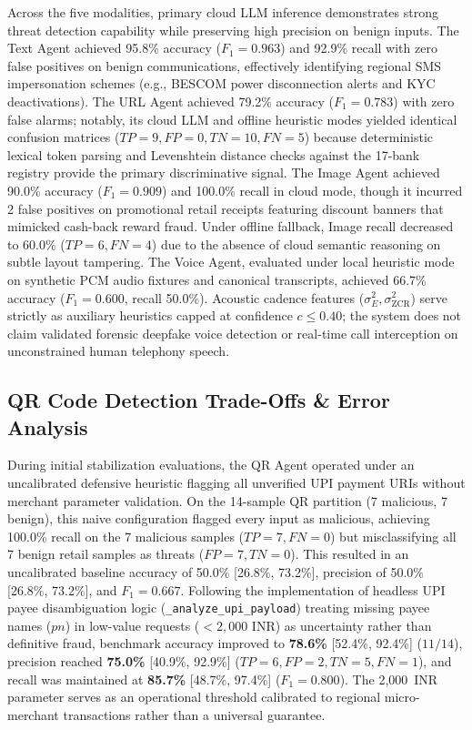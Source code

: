 \documentclass[conference]{IEEEtran}
\begin{document}
Across the five modalities, primary cloud LLM inference demonstrates strong threat detection capability while preserving high precision on benign inputs. The Text Agent achieved 95.8\% accuracy ($F_1 = 0.963$) and 92.9\% recall with zero false positives on benign communications, effectively identifying regional SMS impersonation schemes (e.g., BESCOM power disconnection alerts and KYC deactivations). The URL Agent achieved 79.2\% accuracy ($F_1 = 0.783$) with zero false alarms; notably, its cloud LLM and offline heuristic modes yielded identical confusion matrices ($TP=9, FP=0, TN=10, FN=5$) because deterministic lexical token parsing and Levenshtein distance checks against the 17-bank registry provide the primary discriminative signal. The Image Agent achieved 90.0\% accuracy ($F_1 = 0.909$) and 100.0\% recall in cloud mode, though it incurred 2 false positives on promotional retail receipts featuring discount banners that mimicked cash-back reward fraud. Under offline fallback, Image recall decreased to 60.0\% ($TP=6, FN=4$) due to the absence of cloud semantic reasoning on subtle layout tampering. The Voice Agent, evaluated under local heuristic mode on synthetic PCM audio fixtures and canonical transcripts, achieved 66.7\% accuracy ($F_1 = 0.600$, recall 50.0\%). Acoustic cadence features ($\sigma_E^2, \sigma_{\text{ZCR}}^2$) serve strictly as auxiliary heuristics capped at confidence $c \le 0.40$; the system does not claim validated forensic deepfake voice detection or real-time call interception on unconstrained human telephony speech.

\subsection{QR Code Detection Trade-Offs \& Error Analysis}
During initial stabilization evaluations, the QR Agent operated under an uncalibrated defensive heuristic flagging all unverified UPI payment URIs without merchant parameter validation. On the 14-sample QR partition (7 malicious, 7 benign), this naive configuration flagged every input as malicious, achieving 100.0\% recall on the 7 malicious samples ($TP=7, FN=0$) but misclassifying all 7 benign retail samples as threats ($FP=7, TN=0$). This resulted in an uncalibrated baseline accuracy of 50.0\% [26.8\%, 73.2\%], precision of 50.0\% [26.8\%, 73.2\%], and $F_1 = 0.667$. Following the implementation of headless UPI payee disambiguation logic (\texttt{\_analyze\_upi\_payload}) treating missing payee names ($pn$) in low-value requests ($< 2,000$ INR) as uncertainty rather than definitive fraud, benchmark accuracy improved to \textbf{78.6\%} [52.4\%, 92.4\%] ($11/14$), precision reached \textbf{75.0\%} [40.9\%, 92.9\%] ($TP=6, FP=2, TN=5, FN=1$), and recall was maintained at \textbf{85.7\%} [48.7\%, 97.4\%] ($F_1 = 0.800$). The 2,000~INR parameter serves as an operational threshold calibrated to regional micro-merchant transactions rather than a universal guarantee.
\end{document}
